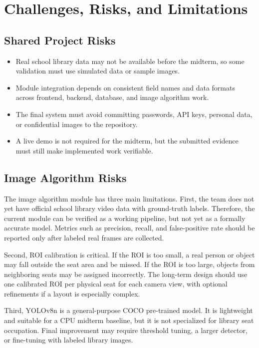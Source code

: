 \section{Challenges, Risks, and Limitations}

\subsection{Shared Project Risks}

\begin{itemize}
  \item Real school library data may not be available before the midterm, so some validation must use simulated data or sample images.
  \item Module integration depends on consistent field names and data formats across frontend, backend, database, and image algorithm work.
  \item The final system must avoid committing passwords, API keys, personal data, or confidential images to the repository.
  \item A live demo is not required for the midterm, but the submitted evidence must still make implemented work verifiable.
\end{itemize}



\subsection{Image Algorithm Risks}

The image algorithm module has three main limitations. First, the team does not yet have official school library video data with ground-truth labels. Therefore, the current module can be verified as a working pipeline, but not yet as a formally accurate model. Metrics such as precision, recall, and false-positive rate should be reported only after labeled real frames are collected.

Second, ROI calibration is critical. If the ROI is too small, a real person or object may fall outside the seat area and be missed. If the ROI is too large, objects from neighboring seats may be assigned incorrectly. The long-term design should use one calibrated ROI per physical seat for each camera view, with optional refinements if a layout is especially complex.

Third, YOLOv8n is a general-purpose COCO pre-trained model. It is lightweight and suitable for a CPU midterm baseline, but it is not specialized for library seat occupation. Final improvement may require threshold tuning, a larger detector, or fine-tuning with labeled library images.
